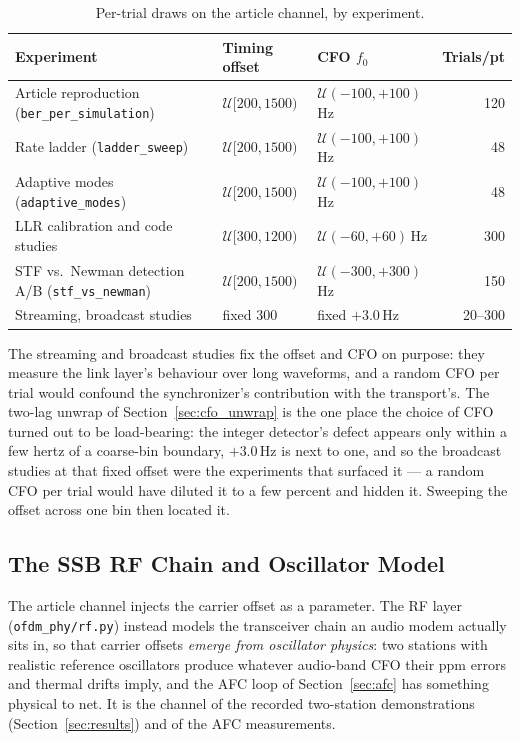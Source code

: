 \begin{table}[H]
    \centering
    \caption{Per-trial draws on the article channel, by experiment.}
    \label{tab:chan_draws}
    \footnotesize
    \begin{tabular}{@{}p{5.6cm}llr@{}}
    \toprule
    \textbf{Experiment} & \textbf{Timing offset} & \textbf{CFO $f_0$} &
        \textbf{Trials/pt} \\
    \midrule
    Article reproduction (\texttt{ber\_per\_simulation}) &
        $\mathcal{U}[200, 1500)$ & $\mathcal{U}(-100, +100)$\,Hz & 120 \\
    Rate ladder (\texttt{ladder\_sweep}) &
        $\mathcal{U}[200, 1500)$ & $\mathcal{U}(-100, +100)$\,Hz & 48 \\
    Adaptive modes (\texttt{adaptive\_modes}) &
        $\mathcal{U}[200, 1500)$ & $\mathcal{U}(-100, +100)$\,Hz & 48 \\
    LLR calibration and code studies &
        $\mathcal{U}[300, 1200)$ & $\mathcal{U}(-60, +60)$\,Hz & 300 \\
    STF vs.\ Newman detection A/B (\texttt{stf\_vs\_newman}) &
        $\mathcal{U}[200, 1500)$ & $\mathcal{U}(-300, +300)$\,Hz & 150 \\
    Streaming, broadcast studies & fixed 300 & fixed $+3.0$\,Hz &
        20--300 \\
    \bottomrule
    \end{tabular}
\end{table}

The streaming and broadcast studies fix the offset and CFO on purpose:
they measure the link layer's behaviour over long waveforms, and a
random CFO per trial would confound the synchronizer's contribution
with the transport's.  The two-lag unwrap of
Section~\ref{sec:cfo_unwrap} is the one place the choice of CFO turned
out to be load-bearing: the integer detector's defect appears only
within a few hertz of a coarse-bin boundary, $+3.0$\,Hz is next to one,
and so the broadcast studies at that fixed offset were the experiments
that surfaced it --- a random CFO per trial would have diluted it to a
few percent and hidden it.  Sweeping the offset across one bin then
located it.

\subsection{The SSB RF Chain and Oscillator Model}
\label{sec:rf}

The article channel injects the carrier offset as a parameter.  The RF
layer (\texttt{ofdm\_phy/rf.py}) instead models the transceiver chain
an audio modem actually sits in, so that carrier offsets \emph{emerge
from oscillator physics}: two stations with realistic reference
oscillators produce whatever audio-band CFO their ppm errors and
thermal drifts imply, and the AFC loop of Section~\ref{sec:afc} has
something physical to net.  It is the channel of the recorded
two-station demonstrations (Section~\ref{sec:results}) and of the AFC
measurements.

